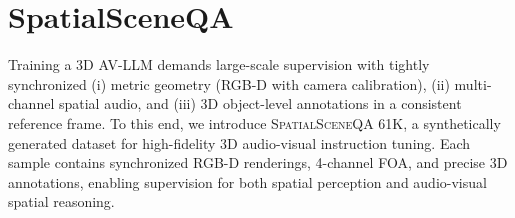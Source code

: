 \section{SpatialSceneQA}

Training a 3D AV-LLM demands large-scale supervision with tightly synchronized (i) metric geometry (RGB-D with camera calibration), (ii) multi-channel spatial audio, and (iii) 3D object-level annotations in a consistent reference frame. 
To this end, we introduce \textsc{SpatialSceneQA} 61K, a synthetically generated dataset for high-fidelity 3D audio-visual instruction tuning. 
Each sample contains synchronized RGB-D renderings, 4-channel FOA, and precise 3D annotations, enabling supervision for both spatial perception and audio-visual spatial reasoning.

\begin{table}[t]
    \centering
    \caption{Statistics of the \textsc{SpatialSceneQA} 61K dataset. Tasks are grouped into ``Perception'' and ``Reasoning categories. \textbf{\#Sources} denotes active audio sources for A--B and inserted loudspeaker assets for C--E. Regarding definitions of different types of tasks, \textbf{A--B} estimate source azimuth and elevation; \textbf{C} predicts the precise Bounding Box of the inserted speaker; \textbf{D--E} identify the correspondence between a target audio speaker and a visual loudspeaker based on spatial audio-visual cues.}

    \label{tab:dataset_stats}
    
\end{table}
